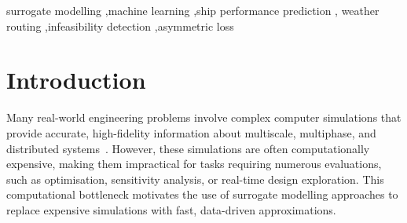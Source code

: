\documentclass[final,5p,times,twocolumn,numbers]{elsarticle}
\begin{document}
\begin{frontmatter}
\begin{keyword}
surrogate modelling \sep machine learning \sep ship performance prediction \sep
weather routing \sep infeasibility detection \sep asymmetric loss
\end{keyword}

\end{frontmatter}

\section{Introduction}
Many real-world engineering problems involve complex computer simulations that provide accurate, high-fidelity information about multiscale, multiphase, and distributed systems~\cite{kim2020machine}. However, these simulations are often computationally expensive, making them impractical for tasks requiring numerous evaluations, such as optimisation, sensitivity analysis, or real-time design exploration. This computational bottleneck motivates the use of surrogate modelling approaches to replace expensive simulations with fast, data-driven approximations.
\end{document}
